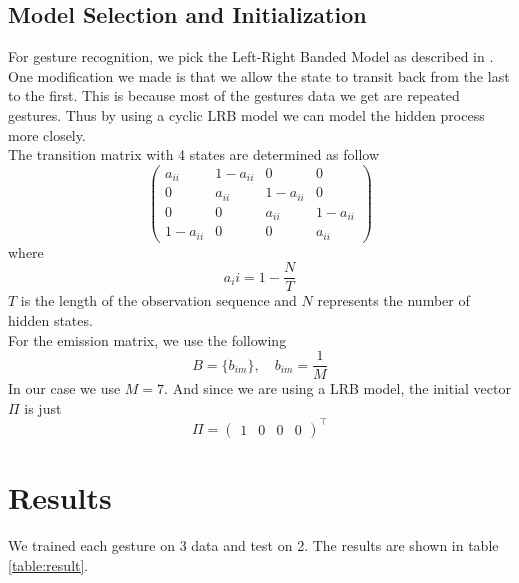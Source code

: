 \documentclass[twoside]{article}
\begin{document}
\begin{multicols}{2}
\subsection{Model Selection and Initialization}
For gesture recognition, we pick the Left-Right Banded Model as described in \cite{Elmez07}. One modification we made is that we allow the state to transit back from the last to the first. This is because most of the gestures data we get are repeated gestures. Thus by using a cyclic LRB model we can model the hidden process more closely. \\
The transition matrix with 4 states are determined as follow
\begin{equation}
\begin{pmatrix}
a_{ii} & 1-a_{ii} & 0 & 0 \\
0 & a_{ii} & 1-a_{ii} & 0 \\
0 & 0 & a_{ii} & 1-a_{ii} \\
1-a_{ii} & 0 & 0 & a_{ii}
\end{pmatrix}
\end{equation}
where
\begin{equation}
a_ii = 1 - \frac{N}{T}
\end{equation}
$T$ is the length of the observation sequence and $N$ represents the number of hidden states.\\
For the emission matrix, we use the following
\begin{equation}
B = \{b_{im}\}, \quad b_{im} = \frac{1}{M}
\end{equation}
In our case we use $M=7$. And since we are using a LRB model, the initial vector $\Pi$ is just
\begin{equation}
\Pi = \begin{pmatrix}
1 & 0 & 0 & 0
\end{pmatrix}^\top
\end{equation}

\section{Results}
We trained each gesture on 3 data and test on 2. The results are shown in table \ref{table:result}.



\end{multicols}
\end{document}
